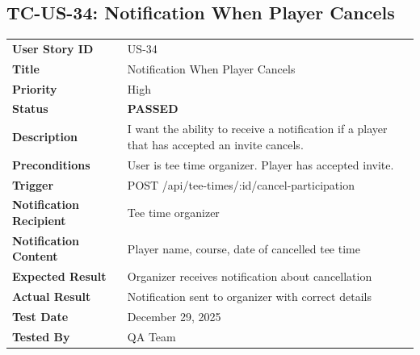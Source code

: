 \documentclass[11pt,a4paper]{article}
\newcommand{\passed}{\textcolor{pass}{\textbf{PASSED}}}
\begin{document}
\vspace{0.5cm}


\subsection{TC-US-34: Notification When Player Cancels}

\begin{tabularx}{\textwidth}{|p{3.2cm}|Y|}
\hline
{}
 \\
\hline
\textbf{User Story ID} & US-34 \\
\hline
\textbf{Title} & Notification When Player Cancels \\
\hline
\textbf{Priority} & High \\
\hline
\textbf{Status} & \passed \\
\hline
\textbf{Description} & I want the ability to receive a notification if a player that has accepted an invite cancels. \\
\hline
\textbf{Preconditions} & User is tee time organizer. Player has accepted invite. \\
\hline
\textbf{Trigger} & POST /api/tee-times/:id/cancel-participation \\
\hline
\textbf{Notification Recipient} & Tee time organizer \\
\hline
\textbf{Notification Content} & Player name, course, date of cancelled tee time \\
\hline
\textbf{Expected Result} & Organizer receives notification about cancellation \\
\hline
\textbf{Actual Result} & Notification sent to organizer with correct details \\
\hline
\textbf{Test Date} & December 29, 2025 \\
\hline
\textbf{Tested By} & QA Team \\
\hline
\end{tabularx}
\end{document}
